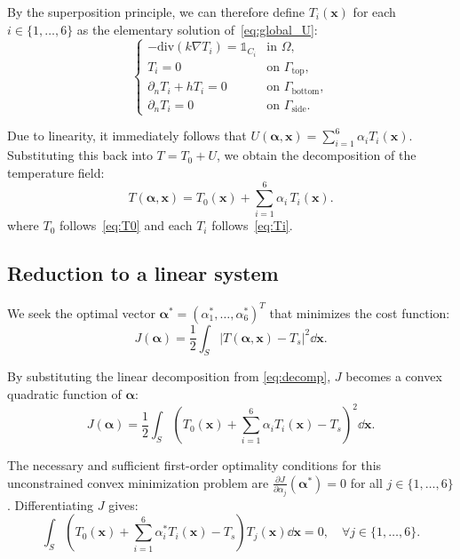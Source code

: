 By the superposition principle, we can therefore define $T_i(\mathbf{x})$ for each $i \in \{1, \dots, 6\}$ as the elementary solution of~\cref{eq:global_U}:
\begin{equation} \label{eq:Ti}
    \begin{cases}
        -\mathrm{div}(k\nabla T_i) = \mathbb{1}_{C_i} & \text{in } \Omega, \\
        T_i = 0 & \text{on } \Gamma_{\text{top}}, \\
        \partial_n T_i + h T_i = 0 & \text{on } \Gamma_{\text{bottom}}, \\
        \partial_n T_i = 0 & \text{on } \Gamma_{\text{side}}.
    \end{cases}
\end{equation}

Due to linearity, it immediately follows that $U(\boldsymbol{\alpha}, \mathbf{x}) = \sum_{i=1}^6 \alpha_i T_i(\mathbf{x})$. Substituting this back into $T = T_0 + U$, we obtain the decomposition of the temperature field:
\begin{equation} \label{eq:decomp}
    T(\boldsymbol{\alpha}, \mathbf{x}) = T_0(\mathbf{x}) + \sum_{i=1}^6 \alpha_i \, T_i(\mathbf{x}).
\end{equation}
where $T_0$ follows~\cref{eq:T0} and each $T_i$ follows~\cref{eq:Ti}.

\subsection{Reduction to a linear system}\label{sec:linear_opti_system}

We seek the optimal vector $\boldsymbol{\alpha}^* = {(\alpha_1^*, \dots, \alpha_6^*)}^T$ that minimizes the cost function:
\begin{equation}\label{eq:cost_func}
    J(\boldsymbol{\alpha}) = \frac{1}{2}\int_S |T(\boldsymbol{\alpha},\mathbf{x}) - T_s|^2 \dd \mathbf{x}.
\end{equation}

By substituting the linear decomposition from \cref{eq:decomp}, $J$ becomes a convex quadratic function of $\boldsymbol{\alpha}$:
\begin{equation}
    J(\boldsymbol{\alpha}) = \frac{1}{2}\int_S {\left( T_0(\mathbf{x}) + \sum_{i=1}^6 \alpha_i T_i(\mathbf{x}) - T_s \right)}^2 \dd \mathbf{x}.
\end{equation}

The necessary and sufficient first-order optimality conditions for this unconstrained convex minimization problem are $\frac{\partial J}{\partial \alpha_j}(\boldsymbol{\alpha}^*) = 0$ for all $j \in \{1,\dots,6\}$. Differentiating $J$ gives:
\begin{equation}
    \int_S \left( T_0(\mathbf{x}) + \sum_{i=1}^6 \alpha_i^* T_i(\mathbf{x}) - T_s \right) T_j(\mathbf{x}) \dd \mathbf{x} = 0, \quad \forall j \in \{1,\dots,6\}.
\end{equation}

